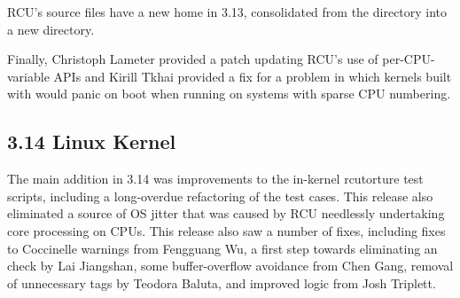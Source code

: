 RCU's source files have a new home in 3.13, consolidated from the
 directory into a new  directory.

Finally, Christoph Lameter provided a patch updating RCU's use of
per-CPU-variable APIs and Kirill Tkhai provided a fix for a problem
in which kernels built with  would
panic on boot when running
on systems with sparse CPU numbering.

\subsection{3.14 Linux Kernel}

The main addition in 3.14 was improvements to the in-kernel rcutorture
test scripts, including a long-overdue refactoring of the test cases.
This release also eliminated a source of OS jitter that was caused
by RCU needlessly undertaking core processing on  CPUs.
This release also saw a number of fixes, including fixes to Coccinelle
warnings from Fengguang Wu, a first step towards eliminating an
 check by Lai Jiangshan, some buffer-overflow
avoidance from Chen Gang, removal of unnecessary  tags by
Teodora Baluta, and improved  logic from
Josh Triplett.

